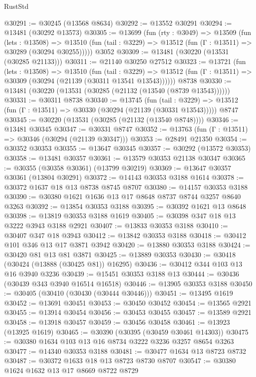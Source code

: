 \begin{lexlean}{RustStd}
\begin{coremodule}
@30291 := @30245 (@13568 @8634)
@30292 := @13552 @30291
@30294 := @13481 (@30292 @13573)
@30305 := @13699
    (fun (rty : @3049) =>
    @13509
      (fun (lets : @13508) =>
      @13510 (fun (tail : @3229) => @13512 (fun (Γ : @13511) => @30289 (@30294 @30255)))))
    @3052
@30309 := @13481 (@30220 (@13531 (@30285 @21133)))
@30311 := @21140 @30250 @27512
@30323 := @13721
    (fun (lets : @13508) =>
    @13510
      (fun (tail : @3229) =>
      @13512 (fun (Γ : @13511) => @30309 (@30294 (@21139 (@30311 @13541 @13543))))))
    @8738
@30330 := @13481 (@30220 (@13531 (@30285 (@21132 (@13540 (@8739 @13543))))))
@30331 := @30311 @8738
@30340 := @13745
    (fun (tail : @3229) => @13512 (fun (Γ : @13511) => @30330 (@30294 (@21139 (@30331 @13543)))))
    @8747
@30345 := @30220 (@13531 (@30285 (@21132 (@13540 @8748))))
@30346 := @13481 @30345
@30347 := @30331 @8747
@30352 := @13763 (fun (Γ : @13511) => @30346 (@30294 (@21139 @30347)))
@30353 := @28491 @21350
@30354 := @30352 @30353
@30355 := @13647 @30345
@30357 := @30292 (@13572 @30353)
@30358 := @13481 @30357
@30361 := @13579 @30353 @21138 @30347
@30365 := @30355 (@30358 @30361) (@13799 @30219)
@30369 := @13647 @30357 @30361 (@13804 @30291)
@30372 := @14143 @30353 @3188 @1614
@30378 := @30372 @1637 @18 @13 @8738 @8745 @8707
@30380 := @14157 @30353 @3188
@30390 := @30380 @1621 @1636 @13 @17 @8648 @8737 @8744 @3257 @8640 @3263
@30392 := @13854 @30353 @3188
@30395 := @30392 @1621 @13 @8648
@30398 := @13819 @30353 @3188 @1619
@30405 := @30398 @347 @18 @13 @3222 @3943 @3188 @2921
@30407 := @13833 @30353 @3188
@30410 := @30407 @347 @18 @3943
@30412 := @13842 @30353 @3188
@30418 := @30412 @101 @346 @13 @17 @3871 @3942
@30420 := @13880 @30353 @3188
@30424 := @30420 @81 @13 @81 @3871
@30425 := @13889 @30353
@30430 := @30418 (@30424 (@13888 (@30425 @81)) @16295)
@30436 := @30412 @344 @103 @13 @16 @3940 @3236
@30439 := @15451 @30353 @3188 @13
@30444 := @30436 (@30439 @343 @3940 @16514 @16518)
@30446 := @13905 @30353 @3188
@30450 := @30405 (@30410 (@30430 (@30444 @30446)))
@30451 := @13495 @1619
@30452 := @13691 @30451
@30453 := @30450 @30452
@30454 := @13565 @2921
@30455 := @13914 @30454
@30456 := @30453 @30455
@30457 := @13589 @2921
@30458 := @13918 @30457
@30459 := @30456 @30458
@30461 := @13923 (@13925 @1619)
@30465 := @30390 (@30395 (@30459 @30461 @14303))
@30475 := @30380 @1634 @103 @13 @16 @8734 @3222 @3236 @3257 @8654 @3263
@30477 := @14340 @30353 @3188
@30481 := @30477 @1634 @13 @8723 @8732
@30487 := @30372 @1633 @18 @13 @8723 @8730 @8707
@30547 := @30380
    @1624
    @1632
    @13
    @17
    @8669
    @8722
    @8729

\end{coremodule}
\end{lexlean}
